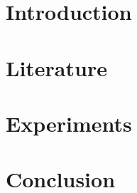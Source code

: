 \documentclass[twoside]{ctuthesis}
\theoremstyle{plain}
\theoremstyle{definition}
\theoremstyle{note}
\begin{document}
\maketitle

\chapter{Introduction}


\chapter{Literature}







\chapter{Experiments}






\chapter{Conclusion}


\appendix

\printindex






\end{document}
